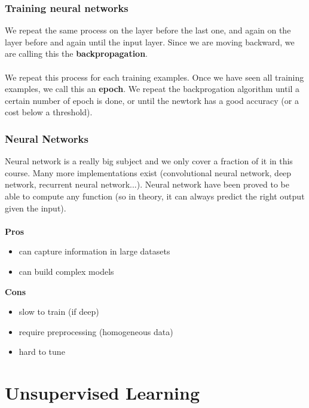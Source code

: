\documentclass{beamer}
\begin{document}
\begin{frame}
  \frametitle{Training neural networks}
  We repeat the same process on the layer before the last one, and again on the
  layer before and again until the input layer. Since we are moving backward, we are
  calling this the \textbf{backpropagation}.\\~\\

  We repeat this process for each training examples. Once we have seen all
  training examples, we call this an \textbf{epoch}. We repeat the backprogation
  algorithm until a certain number of epoch is done, or until the newtork has a
  good accuracy (or a cost below a threshold).
\end{frame}

\begin{frame}
  \frametitle{Neural Networks}
  Neural network is a really big subject and we only cover a fraction of it in
  this course. Many more implementations exist (convolutional neural network,
  deep network, recurrent neural network...). Neural network have been proved to
  be able to compute any function (so in theory, it can always predict the right
  output given the input).
  \\~\\
  \textbf{Pros}
  \begin{itemize}
    \item can capture information in large datasets
    \item can build complex models
  \end{itemize}

  \textbf{Cons}
  \begin{itemize}
    \item slow to train (if deep)
    \item require preprocessing (homogeneous data)
    \item hard to tune
  \end{itemize}
\end{frame}



\section{Unsupervised Learning}

\end{document}
